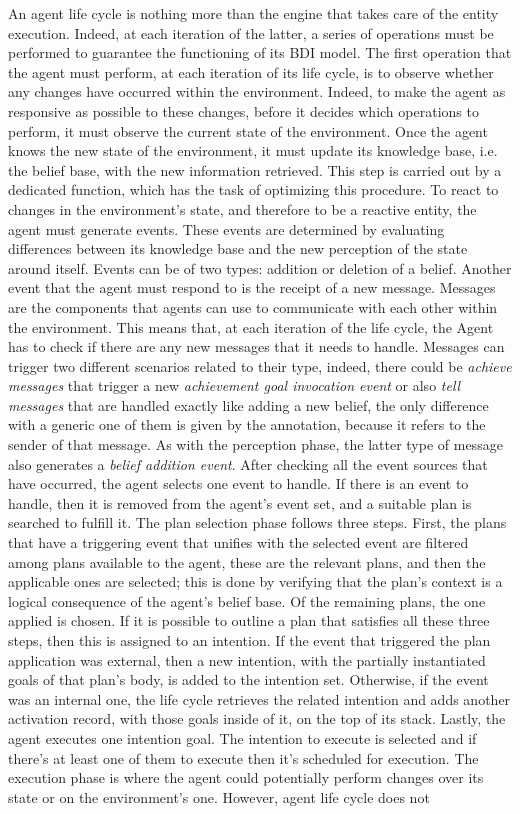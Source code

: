 An agent life cycle is nothing more than the engine that takes care of the entity execution. Indeed, at each iteration of the latter, a series of operations must be performed to guarantee the functioning of its BDI model. The first operation that the agent must perform, at each iteration of its life cycle, is to observe whether any changes have occurred within the environment. Indeed, to make the agent as responsive as possible to these changes, before it decides which operations to perform, it must observe the current state of the environment. Once the agent knows the new state of the environment, it must update its knowledge base, i.e. the belief base, with the new information retrieved. This step is carried out by a dedicated function, which has the task of optimizing this procedure. To react to changes in the environment's state, and therefore to be a reactive entity, the agent must generate events. These events are determined by evaluating differences between its knowledge base and the new perception of the state around itself. Events can be of two types: addition or deletion of a belief. Another event that the agent must respond to is the receipt of a new message. Messages are the components that agents can use to communicate with each other within the environment. This means that, at each iteration of the life cycle, the Agent has to check if there are any new messages that it needs to handle. Messages can trigger two different scenarios related to their type, indeed, there could be \textit{achieve messages} that trigger a new \textit{achievement goal invocation event} or also \textit{tell messages} that are handled exactly like adding a new belief, the only difference with a generic one of them is given by the annotation, because it refers to the sender of that message. As with the perception phase, the latter type of message also generates a \textit{belief addition event}. After checking all the event sources that have occurred, the agent selects one event to handle. If there is an event to handle, then it is removed from the agent's event set, and a suitable plan is searched to fulfill it. The plan selection phase follows three steps. First, the plans that have a triggering event that unifies with the selected event are filtered among plans available to the agent, these are the relevant plans, and then the applicable ones are selected; this is done by verifying that the plan's context is a logical consequence of the agent's belief base. Of the remaining plans, the one applied is chosen. If it is possible to outline a plan that satisfies all these three steps, then this is assigned to an intention. If the event that triggered the plan application was external, then a new intention, with the partially instantiated goals of that plan's body, is added to the intention set. Otherwise, if the event was an internal one, the life cycle retrieves the related intention and adds another activation record, with those goals inside of it, on the top of its stack. Lastly, the agent executes one intention goal. The intention to execute is selected and if there's at least one of them to execute then it's scheduled for execution. The execution phase is where the agent could potentially perform changes over its state or on the environment's one. However, agent life cycle does not 